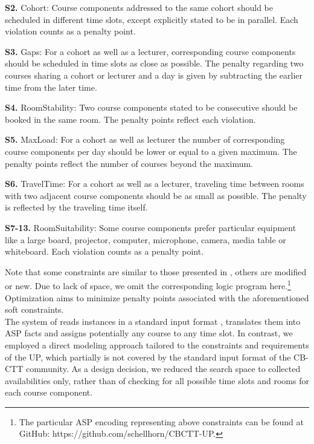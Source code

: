 \documentclass{easychair}
\newcommand{\CBCTT}{CB-CTT}
\newcommand{\UP}{UP}
\newcommand{\ASP}{ASP}
\begin{document}
  \textbf{S2.} Cohort: Course components addressed to the same cohort should be scheduled in different time slots, except explicitly stated to be in parallel. Each violation counts as a penalty point. 

  \textbf{S3.} Gaps: For a cohort as well as a lecturer, corresponding course components should be scheduled in time slots as close as possible. The penalty regarding two courses sharing a cohort or lecturer and a day is given by subtracting the earlier time from the later time. 

  \textbf{S4.} RoomStability: Two course components stated to be consecutive should be booked in the same room. The penalty points reflect each violation. 

  \textbf{S5.} MaxLoad: For a cohort as well as lecturer the number of corresponding course components per day should be lower or equal to a given maximum. The penalty points reflect the number of courses beyond the maximum. 

  \textbf{S6.} TravelTime: For a cohort as well as a lecturer, traveling time between rooms with two adjacent course components should be as small as possible. The penalty is reflected by the traveling time itself. 

  \textbf{S7-13.} RoomSuitability: Some course components prefer particular equipment like a large board, projector, computer, microphone, camera, media table or whiteboard. Each violation counts as a penalty point. 

  Note that some constraints are similar to those presented in \cite{bainkaokscsotawa18a}, others are modified or new.
  Due to lack of space, we omit the corresponding logic program here.\footnote{The particular \ASP{} encoding representing above constraints can be found at GitHub: https://github.com/schellhorn/CBCTT-UP.} 
  Optimization aims to minimize penalty points associated with the aforementioned soft constraints. \\
  The system of \cite{bainkaokscsotawa18a} reads instances in a standard input format \cite{bocegasc12a}, translates them into \ASP{} facts and assigns potentially any course to any time slot. 
  In contrast, we employed a direct modeling approach tailored to the constraints and requirements of the \UP{}, which partially is not covered by the standard input format of the \CBCTT{} community. 
  As a design decision, we reduced the search space to collected availabilities only, rather than of checking for all possible time slots and rooms for each course component.
\end{document}
